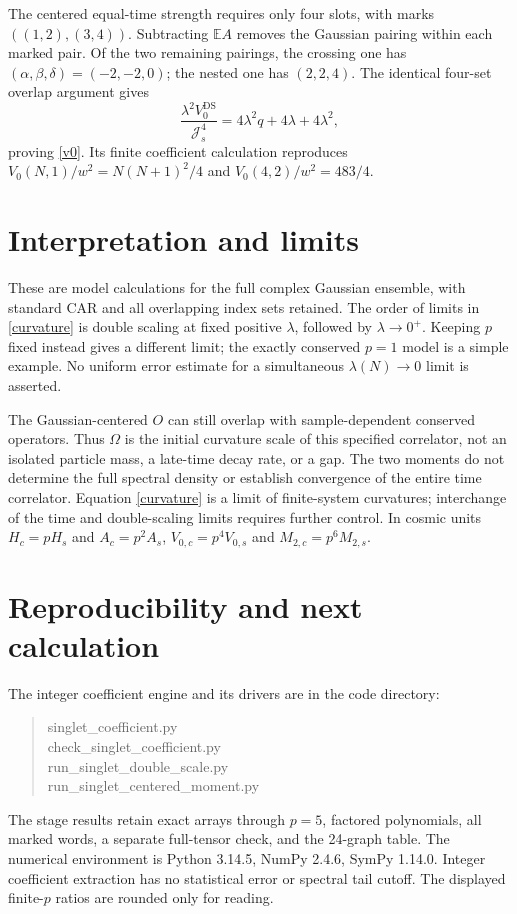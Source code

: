 \documentclass[11pt,a4paper]{article}
\newcommand{\E}{\mathbb E}
\newcommand{\Js}{\mathcal J_s}
\begin{document}
The centered equal-time strength requires only four slots, with marks
$((1,2),(3,4))$. Subtracting $\E A$ removes the Gaussian pairing within
each marked pair. Of the two remaining pairings, the crossing one has
$(\alpha,\beta,\delta)=(-2,-2,0)$; the nested one has $(2,2,4)$.
The identical four-set overlap argument gives
\begin{equation}
 \frac{\lambda^2 V_0^{\mathrm{DS}}}{\Js^4}
 =4\lambda^2q+4\lambda+4\lambda^2,
\end{equation}
proving \eqref{v0}. Its finite coefficient calculation reproduces
$V_0(N,1)/w^2=N(N+1)^2/4$ and $V_0(4,2)/w^2=483/4$.

\section{Interpretation and limits}
These are model calculations for the full complex Gaussian ensemble,
with standard CAR and all overlapping index sets retained. The order
of limits in \eqref{curvature} is double scaling at fixed positive
$\lambda$, followed by $\lambda\to0^+$. Keeping $p$ fixed instead gives
a different limit; the exactly conserved $p=1$ model is a simple example.
No uniform error estimate for a simultaneous $\lambda(N)\to0$ limit
is asserted.

The Gaussian-centered $O$ can still overlap with sample-dependent
conserved operators. Thus $\Omega$ is the initial curvature scale of
this specified correlator, not an isolated particle mass, a late-time
decay rate, or a gap. The two moments do not determine the full spectral
density or establish convergence of the entire time correlator. Equation
\eqref{curvature} is a limit of finite-system curvatures; interchange of
the time and double-scaling limits requires further control.
In cosmic units $H_c=pH_s$ and $A_c=p^2A_s$,
$V_{0,c}=p^4V_{0,s}$ and $M_{2,c}=p^6M_{2,s}$.

\newpage
\section{Reproducibility and next calculation}
The integer coefficient engine and its drivers are in the code directory:
\begin{quote}\small\ttfamily
singlet\_coefficient.py\\
check\_singlet\_coefficient.py\\
run\_singlet\_double\_scale.py\\
run\_singlet\_centered\_moment.py
\end{quote}
The stage results retain exact arrays through $p=5$, factored polynomials,
all marked words, a separate full-tensor check, and the 24-graph table.
The numerical environment is Python 3.14.5, NumPy 2.4.6, SymPy 1.14.0.
Integer coefficient extraction has no statistical error or spectral
tail cutoff. The displayed finite-$p$ ratios are rounded only for reading.
\end{document}
